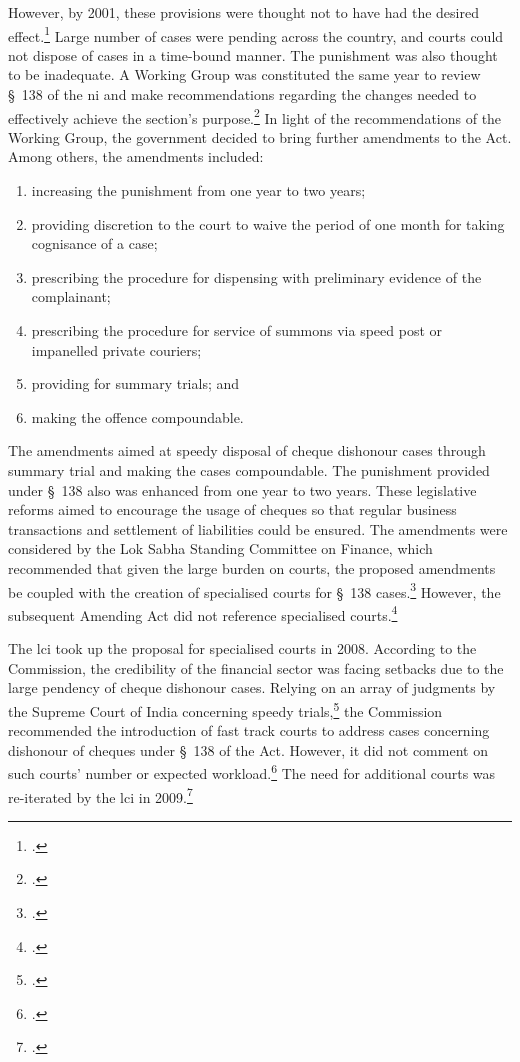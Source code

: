 \documentclass[12pt,a4paper]{article}
\begin{document}
However, by 2001, these provisions were thought not to have had the desired effect.\footcite{stdcomm2001_138niAct} Large number of cases were pending across the country, and courts could not dispose of cases in a time-bound manner. The punishment was also thought to be inadequate. A Working Group was constituted the same year to review \S~138 of the \gls{ni} and make recommendations regarding the changes needed to effectively achieve the section's purpose.\footcite{wg2001_138} In light of the recommendations of the Working Group, the government decided to bring further amendments to the Act. Among others, the amendments included:

\begin{enumerate}[label=(\alph*)]
\item increasing the punishment from one year to two years;
\item providing discretion to the court to waive the period of one month for taking cognisance of a case;
\item prescribing the procedure for dispensing with preliminary evidence of the complainant;
\item prescribing the procedure for service of summons via speed post or impanelled private couriers;
\item providing for summary trials; and
\item making the offence compoundable.
\end{enumerate}

The amendments aimed at speedy disposal of cheque dishonour cases through summary trial and making the cases compoundable. The punishment provided under \S~138 also was enhanced from one year to two years. These legislative
reforms aimed to encourage the usage of cheques so that regular business transactions and settlement of liabilities could be ensured. The amendments were considered by the Lok Sabha Standing Committee on Finance, which recommended that given the large burden on courts, the proposed amendments be coupled with the creation of specialised courts for \S~138 cases.\footcite{stdcomm2001_138niAct} However, the subsequent Amending Act did not reference specialised courts.\footcite{niAmend2002}

The \gls{lci} took up the proposal for specialised courts in 2008. According to the Commission, the credibility of the financial sector was facing setbacks due to the large pendency of cheque dishonour cases. Relying on an array of judgments by the Supreme Court of India concerning speedy trials,\footcite{sc1978_khatoon, sc1981_champalal, sc2005_surinder, sc2008_krishna} the Commission recommended the introduction of fast track courts to address cases concerning dishonour of cheques under \S~138 of the Act. However, it did not comment on such courts' number or expected workload.\footcite{lci2008_138} The need for additional courts was re-iterated by the \gls{lci} in 2009.\footcite{lci2009_reforms}
\end{document}
